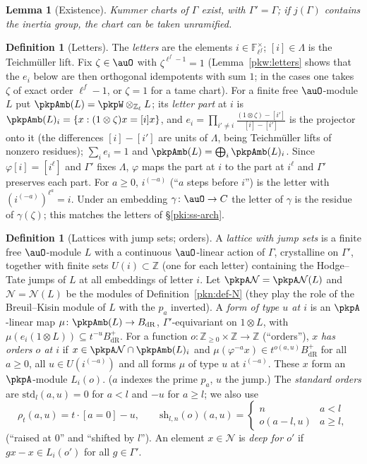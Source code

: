 \documentclass[10pt]{amsart}
\newtheorem{lemma}[theorem]{Lemma}
\theoremstyle{definition}
\newtheorem{definition}[theorem]{Definition}
\theoremstyle{remark}
\newcommand{\Z}{\mathbb Z}
\begin{document}
\begin{lemma}[Existence]\label{pkp:chart-exists}
Kummer charts of $\Gamma$ exist, with $\Gamma'=\Gamma$; if $j(\Gamma)$ contains the inertia group,
the chart can be taken unramified.
\end{lemma}

\begin{definition}[Letters]\label{pkp:def-letters}
The \emph{letters} are the elements $i\in\mathbb F_{\ell^f}^\times$; $[i]\in\Lambda$ is the
Teichm\"uller lift. Fix $\zeta\in\auO$ with $\zeta^{\ell^f-1}=1$ (Lemma~\ref{pkw:letters} shows that the $e_i$ below are then orthogonal idempotents with sum $1$; in the cases one takes $\zeta$ of exact order $\ell^f-1$, or $\zeta=1$ for a tame chart). For a finite free $\auO$-module $L$
put $\pkpAmb(L)=\pkpW\otimes_{\Z_\ell}L$; its \emph{letter part} at $i$ is
$\pkpAmb(L)_i=\{x:(1\otimes\zeta)x=[i]x\}$, and $e_i=\prod_{i'\ne i}\frac{(1\otimes\zeta)-[i']}{[i]-[i']}$
is the projector onto it (the differences $[i]-[i']$ are units of $\Lambda$, being Teichm\"uller lifts
of nonzero residues); $\sum_ie_i=1$ and $\pkpAmb(L)=\bigoplus_i\pkpAmb(L)_i$. Since
$\varphi[i]=[i^\ell]$ and $\Gamma'$ fixes $\Lambda$, $\varphi$ maps the part at $i$ to the part at
$i^\ell$ and $\Gamma'$ preserves each part. For $a\ge0$, $i^{(-a)}$ (``$a$ steps before $i$'') is the
letter with $(i^{(-a)})^{\ell^a}=i$. Under an embedding $\gamma\colon\auO\to C$ the letter of
$\gamma$ is the residue of $\gamma(\zeta)$; this matches the letters of \S\ref{pki:ss-arch}.
\end{definition}

\begin{definition}[Lattices with jump sets; orders]\label{pkp:def-orders}
A \emph{lattice with jump sets} is a finite free $\auO$-module $L$ with a continuous $\auO$-linear
action of $\Gamma$, crystalline on $\Gamma'$, together with finite sets $U(i)\subset\Z$ (one for each
letter) containing the Hodge--Tate jumps of $L$ at all embeddings of letter $i$. Let
$\pkpA\mathcal N=\pkpA\mathcal N(L)$ and $\mathcal N=\mathcal N(L)$ be the modules of
Definition~\ref{pkn:def-N} (they play the role of the Breuil--Kisin module of $L$ with the $p_a$
inverted). A \emph{form of type
$u$ at $i$} is an $\pkpA$-linear map $\mu\colon\pkpAmb(L)\to B_{\mathrm{dR}}$, $\Gamma'$-equivariant on
$1\otimes L$, with $\mu(e_i(1\otimes L))\subseteq t^{-u}B^+_{\mathrm{dR}}$. For a function
$o\colon\Z_{\ge0}\times\Z\to\Z$ (``orders''), $x$ \emph{has orders $o$ at $i$} if $x\in\pkpA\mathcal
N\cap\pkpAmb(L)_i$ and $\mu(\varphi^{-a}x)\in t^{o(a,u)}B^+_{\mathrm{dR}}$ for all $a\ge0$, all $u\in
U(i^{(-a)})$ and all forms $\mu$ of type $u$ at $i^{(-a)}$. These $x$ form an $\pkpA$-module
$L_i(o)$. ($a$ indexes the prime $p_a$, $u$ the jump.) The \emph{standard orders} are
$\mathrm{std}_l(a,u)=0$ for $a<l$ and $-u$ for $a\ge l$; we also use
\[
\rho_t(a,u)=t\cdot[a=0]-u,\qquad \mathrm{sh}_{l,n}(o)(a,u)=\begin{cases}n&a<l\\ o(a-l,u)&a\ge
l,\end{cases}
\]
(``raised at $0$'' and ``shifted by $l$''). An element $x\in\mathcal N$ is \emph{deep for $o'$} if
$gx-x\in L_i(o')$ for all $g\in\Gamma'$.
\end{definition}
\end{document}
